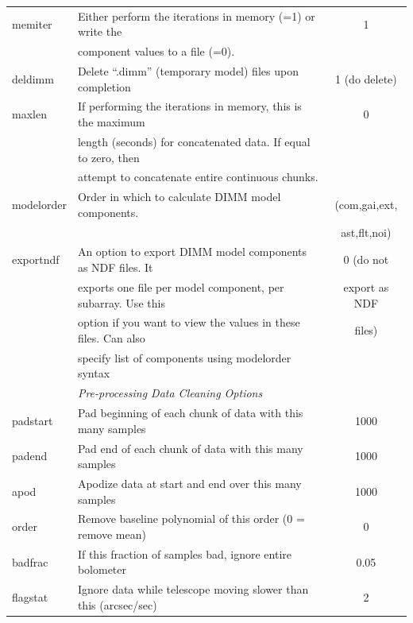 \documentclass[twoside,11pt]{article}
\renewcommand{\_}{\texttt{\symbol{95}}}
\begin{document}
\begin{table}
\begin{tabular}{llc}
memiter          & Either perform the iterations in memory (=1) or write the           &    1 \\
                 & component values to a file (=0).                                    & \\
deldimm          & Delete ``.dimm'' (temporary model) files upon completion            & 1 (do delete)\\
maxlen           & If performing the iterations in memory, this is the maximum         &    0 \\
                 & length (seconds) for concatenated data. If equal to zero, then      & \\
                 & attempt to concatenate entire continuous chunks.                    & \\
modelorder       & Order in which to calculate DIMM model components.                  & (com,gai,ext,\\
                 &                                                                     &  ast,flt,noi)\\
exportndf        & An option to export DIMM model components as NDF files. It          & 0 (do not\\
                 & exports one file per model component, per subarray. Use this        & export as NDF\\
                 & option if you want to view the values in these files. Can also      & files)\\
                 & specify list of components using modelorder syntax                  & \\
\hline
                 & \multicolumn{2}{l}{\em Pre-processing Data Cleaning Options} \\
\hline
padstart         & Pad beginning of each chunk of data with this many samples          & 1000 \\
padend           & Pad end of each chunk of data with this many samples                & 1000 \\
apod             & Apodize data at start and end over this many samples                & 1000 \\
order            & Remove baseline polynomial of this order (0 = remove mean)          & 0 \\
badfrac          & If this fraction of samples bad, ignore entire bolometer            & 0.05 \\
flagstat         & Ignore data while telescope moving slower than this (arcsec/sec)    & 2 \\

\end{tabular}
\end{table}
\end{document}
